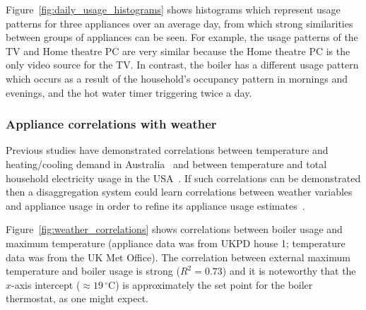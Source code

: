 \documentclass{sig-alternate}
\newcommand{\bluecolor}[1]{\textcolor{blue}{#1}}
\begin{document}
\noindent
Figure~\ref{fig:daily_usage_histograms} shows histograms which represent usage patterns for three appliances over
an average day, from which strong similarities between groups of appliances can be seen.  For
example, the usage patterns of the TV and Home theatre PC are very
similar because the Home theatre PC is the only video source for the TV. In contrast, the boiler has a different usage pattern which occurs as a result of the household's occupancy pattern in mornings and evenings, and the hot water timer triggering twice a day.

\subsubsection{Appliance correlations with weather}
\label{sec:weather_correlation}
\noindent
Previous studies have demonstrated correlations
between temperature and heating/cooling demand in
Australia~\cite{RicharddeDear2002} and between temperature and total
household electricity usage in the USA~\cite{Kavousian2013a}.  
If such correlations can be demonstrated then a disaggregation
system could learn correlations between weather variables and
appliance usage in order to refine its appliance usage estimates~\cite{wytock_2013}.

Figure~\ref{fig:weather_correlations} shows correlations between
boiler usage and maximum temperature (appliance data was from UKPD house 1; temperature data was from the UK Met Office).  The correlation between
external maximum temperature and boiler usage is strong ($R^2=0.73$) and it is
noteworthy that the $x$-axis intercept ($\approx19\,^{\circ}\mathrm{C}$)
is approximately the set point for the boiler thermostat, as one might
expect.  

\end{document}
